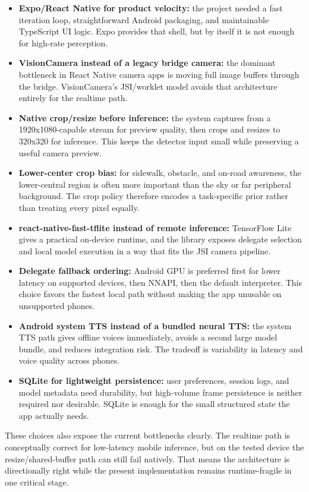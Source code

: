 \documentclass[conference]{IEEEtran}
\begin{document}
\begin{itemize}[leftmargin=1.2em]
\item \textbf{Expo/React Native for product velocity:} the project needed a fast iteration loop, straightforward Android packaging, and maintainable TypeScript UI logic. Expo provides that shell, but by itself it is not enough for high-rate perception.
\item \textbf{VisionCamera instead of a legacy bridge camera:} the dominant bottleneck in React Native camera apps is moving full image buffers through the bridge. VisionCamera's JSI/worklet model avoids that architecture entirely for the realtime path.
\item \textbf{Native crop/resize before inference:} the system captures from a 1920x1080-capable stream for preview quality, then crops and resizes to 320x320 for inference. This keeps the detector input small while preserving a useful camera preview.
\item \textbf{Lower-center crop bias:} for sidewalk, obstacle, and on-road awareness, the lower-central region is often more important than the sky or far peripheral background. The crop policy therefore encodes a task-specific prior rather than treating every pixel equally.
\item \textbf{react-native-fast-tflite instead of remote inference:} TensorFlow Lite gives a practical on-device runtime, and the library exposes delegate selection and local model execution in a way that fits the JSI camera pipeline.
\item \textbf{Delegate fallback ordering:} Android GPU is preferred first for lower latency on supported devices, then NNAPI, then the default interpreter. This choice favors the fastest local path without making the app unusable on unsupported phones.
\item \textbf{Android system TTS instead of a bundled neural TTS:} the system TTS path gives offline voices immediately, avoids a second large model bundle, and reduces integration risk. The tradeoff is variability in latency and voice quality across phones.
\item \textbf{SQLite for lightweight persistence:} user preferences, session logs, and model metadata need durability, but high-volume frame persistence is neither required nor desirable. SQLite is enough for the small structured state the app actually needs.
\end{itemize}

These choices also expose the current bottlenecks clearly. The realtime path is conceptually correct for low-latency mobile inference, but on the tested device the resize/shared-buffer path can still fail natively. That means the architecture is directionally right while the present implementation remains runtime-fragile in one critical stage.
\end{document}
